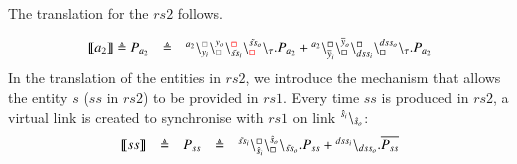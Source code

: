 \begin{example}
\[\begin{array}{lclcl}
\end{array}
\]


%


\noindent
The translation for the $rs2$ follows.

\[
\begin{array}{lcl}
\llbracket a_2\rrbracket \defeq P_{a_2}&\defeq &\startchain{a_2}\chainedlink{y_i}{{\color{gray}\noact}}\chainedlink{{\color{gray}\noact}}{y_o}\chainedlink{\tilde{ss}_i}{{\color{red}\noact}}\chainedlink{{\color{red}\noact}}{\tilde{ss}_o}\chainend{\silent}.P_{a_2}+
\startchain{a_2}\chainedlink{\overline{y}_i}{\noact}\chainedlink{\noact}{\overline{y}_o}    
\chainedlink{dss_i}{\noact}\chainedlink{\noact}{dss_o}\chainend{\silent}.P_{a_2}\\
%
\end{array}
\]
\noindent
In the translation of the entities in  $rs2$, we introduce the mechanism that allows the entity
$s$ ($ss$ in $rs2$) to be provided in $rs1$. Every time $ss$ is produced in $rs2$,  a virtual link is
created to synchronise with $rs1$   on link ${}^{\hat{s}_i} \backslash_{\hat{s}_o}$:
\[
\begin{array}{lclcl}
\llbracket ss \rrbracket& \triangleq& P_{ss}&\triangleq &{}^{\tilde{ss}_i}\backslash_{\hat{s}_i}^{\scriptstyle {\square}}\backslash_{\scriptstyle {\square}}^{\hat{s}_o}\backslash_{\tilde{ss}_o}.P_{ss}+
{}^{dss_i}   \backslash_{dss_o}.\overline{P_{ss}} \\



\end{array}\]
\end{example}
